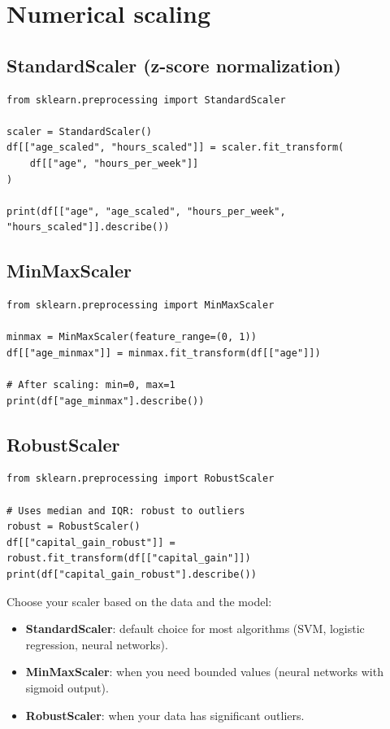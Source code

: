 \section{Numerical scaling}

\subsection{StandardScaler (z-score normalization)}

\begin{verbatim}
from sklearn.preprocessing import StandardScaler

scaler = StandardScaler()
df[["age_scaled", "hours_scaled"]] = scaler.fit_transform(
    df[["age", "hours_per_week"]]
)

print(df[["age", "age_scaled", "hours_per_week", "hours_scaled"]].describe())
\end{verbatim}

\subsection{MinMaxScaler}

\begin{verbatim}
from sklearn.preprocessing import MinMaxScaler

minmax = MinMaxScaler(feature_range=(0, 1))
df[["age_minmax"]] = minmax.fit_transform(df[["age"]])

# After scaling: min=0, max=1
print(df["age_minmax"].describe())
\end{verbatim}

\subsection{RobustScaler}

\begin{verbatim}
from sklearn.preprocessing import RobustScaler

# Uses median and IQR: robust to outliers
robust = RobustScaler()
df[["capital_gain_robust"]] = robust.fit_transform(df[["capital_gain"]])
print(df["capital_gain_robust"].describe())
\end{verbatim}

\begin{preprocesstip}
Choose your scaler based on the data and the model:
\begin{itemize}
  \item \textbf{StandardScaler}: default choice for most algorithms (SVM, logistic regression, neural networks).
  \item \textbf{MinMaxScaler}: when you need bounded values (neural networks with sigmoid output).
  \item \textbf{RobustScaler}: when your data has significant outliers.
\end{itemize}
\end{preprocesstip}

